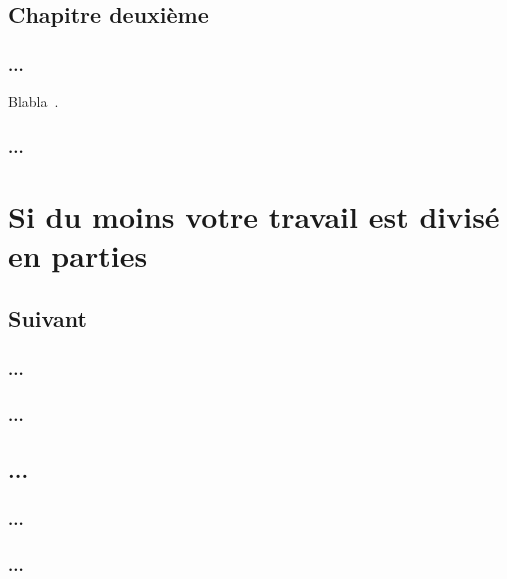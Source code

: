 \chapter{Chapitre deuxième}
\label{chap2}
\section{...}Blabla~\cite{ref4}.
\section{...}
\label{sec-untel}
\part{Si du moins votre travail est divisé en parties}
\chapter{Suivant}

\section{...}
\section{...}
\chapter{...}

\section{...}
\section{...}